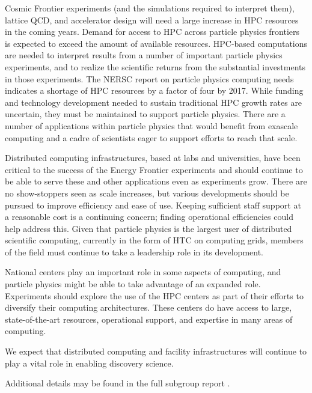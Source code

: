 Cosmic Frontier experiments (and the simulations required to interpret them), lattice QCD, and accelerator design will need a large increase in HPC resources in the coming years. Demand for access to HPC across particle physics frontiers is expected to exceed the amount of available resources.  HPC-based computations are needed to interpret results from a number of important particle physics experiments, and to realize the scientific returns from the substantial investments in those experiments.  The NERSC report on particle physics computing needs \cite{NERSCHEP} indicates a shortage of HPC resources by a factor of four by 2017.  While funding and technology development needed to sustain traditional HPC growth rates are uncertain, they must be maintained to support particle physics.  There are a number of applications within particle physics that would benefit from exascale computing and a cadre of scientists eager to support efforts to reach that scale.

Distributed computing infrastructures, based at labs and universities, have been critical to the success of the Energy Frontier experiments and should continue to be able to serve these and other applications even as experiments grow.  There are no show-stoppers seen as scale increases, but various developments should be pursued to improve efficiency and ease of use.  Keeping sufficient staff support at a reasonable cost is a continuing concern; finding operational efficiencies could help address this.  Given that particle physics is the largest user of distributed scientific computing, currently in the form of HTC on computing grids, members of the field must continue to take a leadership role in its development.

National centers play an important role in some aspects of computing, and particle physics might be able to take advantage of an expanded role.  Experiments should explore the use of the HPC centers as part of their efforts to diversify their computing architectures.  These centers do have access to large, state-of-the-art resources, operational support, and expertise in many areas of computing.

We expect that distributed computing and facility infrastructures will continue to play a vital role in enabling discovery science.

Additional details may be found in the full subgroup report \cite{Bloom:2013yva}.

